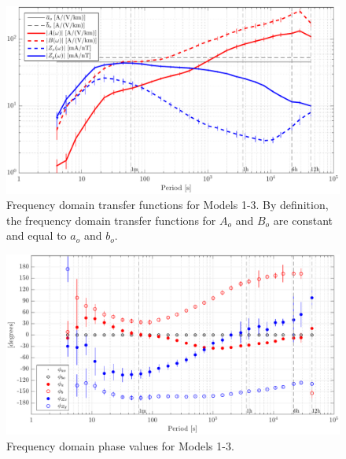 \documentclass[draft,linenumbers]{agujournal2018}
\begin{document}
\begin{figure}[h]
\centering
\includegraphics[width=\textwidth]{figures/plot_TF_aves_Z-options-1.pdf}
\caption{Frequency domain transfer functions for Models 1-3. By definition, the frequency domain transfer functions for $A_o$ and $B_o$ are constant and equal to $a_o$ and $b_o$.}
\label{Z}
\end{figure}

\begin{figure}[h]
\centering
\includegraphics[width=\textwidth]{figures/plot_TF_aves_Phi-options-1.pdf}
\caption{Frequency domain phase values for Models 1-3.}
\label{Phi}
\end{figure}



\end{document}
